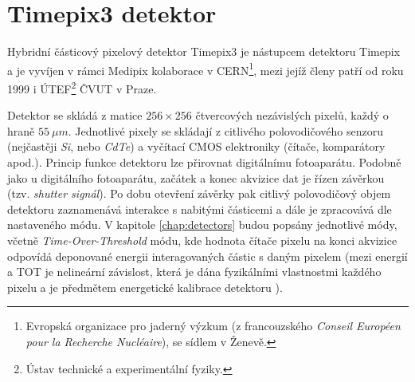 \section{Timepix3 detektor}
Hybridní částicový pixelový detektor Timepix3 \cite{timepix3} je nástupcem detektoru Timepix \cite{timepix} a je vyvíjen v rámci Medipix kolaborace v CERN\footnote{Evropská organizace pro jaderný výzkum (z francouzského \textit{Conseil Européen pour la Recherche Nucléaire}), se sídlem v Ženevě.}, mezi jejíž členy patří od roku 1999 i ÚTEF\footnote{Ústav technické a experimentální fyziky.} ČVUT v Praze.

Detektor se skládá z matice $256\times256$ čtvercových nezávislých pixelů, každý o hraně $55~\mu m$. 
Jednotlivé pixely se skládají z citlivého polovodičového senzoru (nejčastěji \textit{Si}, nebo \textit{CdTe}) a vyčítací CMOS elektroniky (čítače, komparátory apod.). Princip funkce detektoru lze přirovnat digitálnímu fotoaparátu. Podobně jako u digitálního fotoaparátu, začátek a konec akvizice dat je řízen závěrkou (tzv. \textit{shutter signál}). Po dobu otevření závěrky pak citlivý polovodičový objem detektoru zaznamenává interakce s nabitými částicemi a dále je zpracovává dle nastaveného módu. V kapitole \ref{chap:detectors} budou popsány jednotlivé módy, včetně \textit{Time-Over-Threshold} módu, kde hodnota čítače pixelu na konci akvizice odpovídá deponované energii interagovaných částic s daným pixelem (mezi energií a TOT je nelineární závislost, která je dána fyzikálními vlastnostmi každého pixelu a je předmětem energetické kalibrace detektoru \cite{Jakubek2011S262}). 

